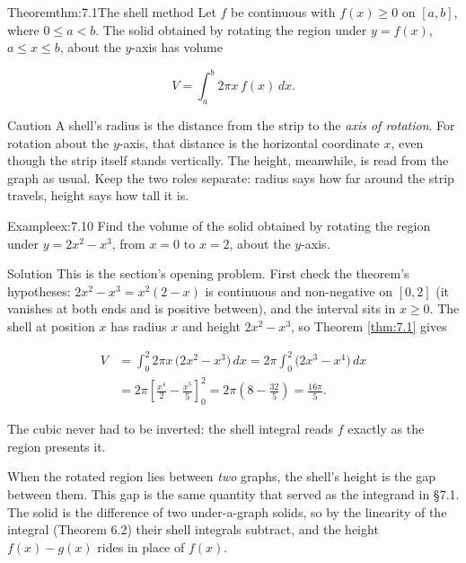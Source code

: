 \documentclass[a4paper,12pt,oneside]{memoir}
\begin{document}
\begin{envtheorem}{Theorem}{thm:7.1}{The shell method}
Let \(f\) be continuous with \(f(x) \ge 0\) on \([a, b]\), where \(0 \le a < b\). The solid obtained by rotating the region under \(y = f(x)\), \(a \le x \le b\), about the \(y\)-axis has volume

\[ V = \int_{a}^{b} 2\pi x\,f(x)\,dx. \]
\end{envtheorem}
\begin{envcaution}{Caution}{}{}
A shell’s radius is the distance from the strip to the \emph{axis of rotation}. For rotation about the \(y\)-axis, that distance is the horizontal coordinate \(x\), even though the strip itself stands vertically. The height, meanwhile, is read from the graph as usual. Keep the two roles separate: radius says how far around the strip travels, height says how tall it is.
\end{envcaution}
\begin{workedexample}
\begin{envexample}{Example}{ex:7.10}{}
Find the volume of the solid obtained by rotating the region under \(y = 2x^{2} - x^{3}\), from \(x = 0\) to \(x = 2\), about the \(y\)-axis.
\end{envexample}
\begin{envsolution}{Solution}{}{}
This is the section’s opening problem. First check the theorem’s hypotheses: \(2x^{2} - x^{3} = x^{2}(2 - x)\) is continuous and non-negative on \([0, 2]\) (it vanishes at both ends and is positive between), and the interval sits in \(x \ge 0\). The shell at position \(x\) has radius \(x\) and height \(2x^{2} - x^{3}\), so Theorem \ref{thm:7.1} gives

\[ \begin{aligned}
          V &= \int_{0}^{2} 2\pi x\,\bigl(2x^{2} - x^{3}\bigr)\,dx = 2\pi \int_{0}^{2} \bigl(2x^{3} - x^{4}\bigr)\,dx \\[2pt]
            &= 2\pi \left[\frac{x^{4}}{2} - \frac{x^{5}}{5}\right]_{0}^{2} = 2\pi\left(8 - \frac{32}{5}\right) = \frac{16\pi}{5}.
        \end{aligned} \]

The cubic never had to be inverted: the shell integral reads \(f\) exactly as the region presents it. \qedmark
\end{envsolution}
\end{workedexample}
When the rotated region lies between \emph{two} graphs, the shell’s height is the gap between them. This gap is the same quantity that served as the integrand in §7.1. The solid is the difference of two under-a-graph solids, so by the linearity of the integral (Theorem 6.2) their shell integrals subtract, and the height \(f(x) - g(x)\) rides in place of \(f(x)\).
\end{document}
